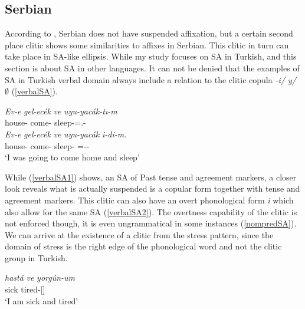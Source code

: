 \subsection{Serbian}

According to \cite{despic2017suspended}, Serbian does not have suspended affixation, but a certain second place clitic shows some similarities to affixes in Serbian. This clitic in turn can take place in SA-like ellipsis. While my study focuses on SA in Turkish, and this section is about SA in other languages. It can not be denied that the examples of SA in Turkish verbal domain always include a relation to the clitic copula \textit{-i/ y/ $\emptyset$} (\ref{verbalSA}).

\begin{exe}
    \ex \label{verbalSA}
    \begin{xlist}
        \ex \label{verbalSA1}
        \gll 
        \textit{Ev-e} \textit{gel-ec\'{e}k} \textit{ve} \textit{uyu-yac\'{a}k-tı-m} \\ house-{\Dat} come-{\Fut} {\And} sleep-{\Fut}={\Cop}.{\Pst}-{\First}{\Sg} \\
        
        \ex \label{verbalSA2}
        \gll 
        \textit{Ev-e} \textit{gel-ec\'{e}k} \textit{ve} \textit{uyu-yac\'{a}k} \textit{i-di-m.} \\ house-{\Dat} come-{\Fut} {\And} sleep-{\Fut} ={\Cop}-{\Pst}-{\First}{\Sg} \\
        \glt `I was going to come home and sleep'
    \end{xlist}
\end{exe}

While (\ref{verbalSA1}) shows, an SA of Past tense and agreement markers, a closer look reveals what is actually suspended is a copular form together with tense and agreement markers. This clitic can also have an overt phonological form \textit{i} which also allow for the same SA (\ref{verbalSA2}). The overtness capability of the clitic is not enforced though, it is even ungrammatical in some instances (\ref{nompredSA}). We can arrive at the existence of a clitic from the stress pattern, since the domain of stress is the right edge of the phonological word and not the clitic group in Turkish.

\begin{exe}
    \ex \label{nompredSA}
    \begin{xlist}
        \ex 
        \gll 
        \textit{hast\'{a}} \textit{ve} \textit{yorg\'{u}n-um} \\ sick {\And} tired-{\First}{\Sg}[{\Prs}] \\
        \glt `I am sick and tired'
    \end{xlist}
\end{exe}

